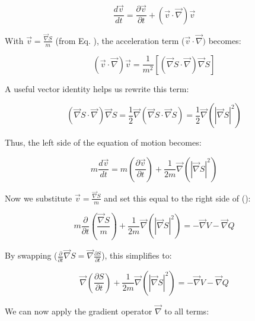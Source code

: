 \begin{equation}
    \frac{d\vec{v}}{dt} = \frac{\partial \vec{v}}{\partial t} + (\vec{v} \cdot \vec{\nabla}) \vec{v}
\end{equation}

With $\vec{v} = \frac{\vec{\nabla} S}{m}$ (from Eq. ), the acceleration term ($\vec{v} \cdot \vec{\nabla})$ becomes:

\begin{equation}
    (\vec{v} \cdot \vec{\nabla}) \vec{v} = \frac{1}{m^2} \left[ (\vec{\nabla} S \cdot \vec{\nabla}) \vec{\nabla} S \right]
\end{equation}

A useful vector identity helps us rewrite this term:

\begin{equation}
    (\vec{\nabla} S \cdot \vec{\nabla}) \vec{\nabla} S = \frac{1}{2} \vec{\nabla} (\vec{\nabla} S \cdot \vec{\nabla} S) = \frac{1}{2} \vec{\nabla} (\left|\vec{\nabla} S \right|^2)
\end{equation}

Thus, the left side of the equation of motion becomes:

\begin{equation}
    m \frac{d\vec{v}}{dt} = m \left( \frac{\partial \vec{v}}{\partial t} \right) + \frac{1}{2m} \vec{\nabla} (\left| \vec{\nabla} S \right|^2)
\end{equation}

Now we substitute $\vec{v} = \frac{\vec{\nabla} S}{m}$ and set this equal to the right side of ():

\begin{equation}
    m \frac{\partial}{\partial t}\left( \frac{\vec{\nabla} S}{m} \right) + \frac{1}{2m} \vec{\nabla} (\left| \vec{\nabla} S \right|^2) = -\vec{\nabla} V - \vec{\nabla} Q
\end{equation}

By swapping ($\frac{\partial}{\partial t} \vec{\nabla} S = \vec{\nabla} \frac{\partial S}{\partial t}$), this simplifies to:

\begin{equation}
    \vec{\nabla} \left( \frac{\partial S}{\partial t} \right) + \frac{1}{2m} \vec{\nabla} (\left| \vec{\nabla} S \right|^2) = -\vec{\nabla} V - \vec{\nabla} Q
\end{equation}

We can now apply the gradient operator $\vec{\nabla}$ to all terms:

